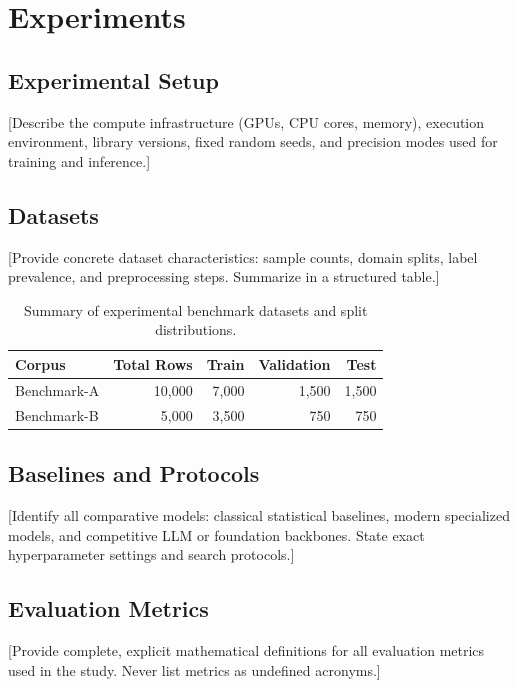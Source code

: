 \documentclass[a4paper,fleqn]{cas-sc}
\begin{document}
\section{Experiments}\label{sec:experiments}

\subsection{Experimental Setup}
[Describe the compute infrastructure (GPUs, CPU cores, memory), execution environment, library versions, fixed random seeds, and precision modes used for training and inference.]

\subsection{Datasets}
[Provide concrete dataset characteristics: sample counts, domain splits, label prevalence, and preprocessing steps. Summarize in a structured table.]

\begin{table}[b]
  \centering
  \caption{Summary of experimental benchmark datasets and split distributions.}
  \label{tab:datasets}
  \begin{tabular}{lrrrr}
    \toprule
    \textbf{Corpus} & \textbf{Total Rows} & \textbf{Train} & \textbf{Validation} & \textbf{Test} \\
    \midrule
    Benchmark-A     & 10{,}000            & 7{,}000        & 1{,}500             & 1{,}500       \\
    Benchmark-B     & 5{,}000             & 3{,}500        & 750                 & 750           \\
    \bottomrule
  \end{tabular}
\end{table}

\subsection{Baselines and Protocols}
[Identify all comparative models: classical statistical baselines, modern specialized models, and competitive LLM or foundation backbones. State exact hyperparameter settings and search protocols.]

\subsection{Evaluation Metrics}
[Provide complete, explicit mathematical definitions for all evaluation metrics used in the study. Never list metrics as undefined acronyms.]
\end{document}
